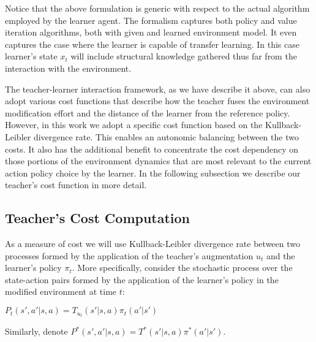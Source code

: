 \documentclass[letterpaper]{aamas2009}
\begin{document}
Notice that the above formulation is generic with respect to the
actual algorithm employed by the learner agent. The formalism captures
both policy and value iteration algorithms, both with given and
learned environment model. It even captures the case where the learner
is capable of transfer learning. In this case learner's state $x_t$
will include structural knowledge gathered thus far from the
interaction with the environment. 

The teacher-learner interaction framework, as we have describe it
above, can also adopt various cost functions that describe how the
teacher fuses the environment modification effort and the distance of
the learner from the reference policy. However, in this work we adopt
a specific cost function based on the Kullback-Leibler divergence
rate. This enables an autonomic balancing between the two costs. It also
has the additional benefit to concentrate the cost dependency on those
portions of the environment dynamics that are most relevant to the
current action policy choice by the learner. In the following
subsection we describe our teacher's cost function in more detail.

\subsection{Teacher's Cost Computation}
As a measure of cost we will use Kullback-Leibler divergence rate
between two processes formed by the application of the teacher's
augmentation $u_t$ and the learner's policy $\pi_t$. More specifically,
consider the stochastic process over the state-action pairs formed by
the application of the learner's policy in the modified environment at
time $t$: \\
\centerline{$
P_t(s',a'|s,a)=T_{u_t}(s'|s,a)\pi_t(a'|s')
$}

Similarly, denote $P^*(s',a'|s,a)=T^*(s'|s,a)\pi^*(a'|s')$.
\end{document}
